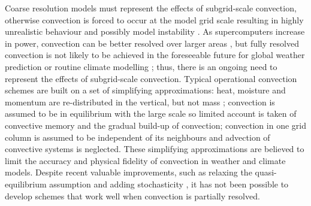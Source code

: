 \documentclass[11pt,a4paper]{article}
\begin{document}

Coarse resolution models must represent the effects of subgrid-scale convection, otherwise convection is forced to occur at the model grid scale resulting in highly unrealistic behaviour and possibly model instability \cite[]{PY15}.
As supercomputers increase in power, convection can be better resolved over larger areas \cite[e.g.][]{GC17}, but fully resolved convection is not likely to be achieved in the foreseeable future for global weather prediction or routine climate modelling \cite[e.g.][]{SSJ+19}; thus, there is an ongoing need to represent the effects of subgrid-scale convection.
Typical operational convection schemes are built on a set of simplifying approximations:
heat, moisture and momentum are re-distributed in the vertical, but not mass \cite[]{Tied89,GR90}; convection is assumed to be in equilibrium with the large scale so limited account is taken of convective memory and the gradual build-up of convection; convection in one grid column is assumed to be independent of its neighbours and advection of convective systems is neglected. These simplifying approximations are believed to limit the accuracy and physical fidelity of
convection in weather and climate models. Despite recent valuable improvements, such as relaxing the quasi-equilibrium assumption \cite[]{PR98,GG05,Par14} and adding stochasticity \cite[]{PC08}, it has not been possible to develop schemes that work well when convection is partially resolved.
\end{document}
